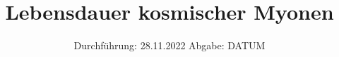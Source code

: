 

\subject{V01}
\title{Lebensdauer kosmischer Myonen}
\date{%
  Durchführung: 28.11.2022
  \hspace{3em}
  Abgabe: DATUM
}



\maketitle
\setcounter{page}{1}








\printbibliography{}


